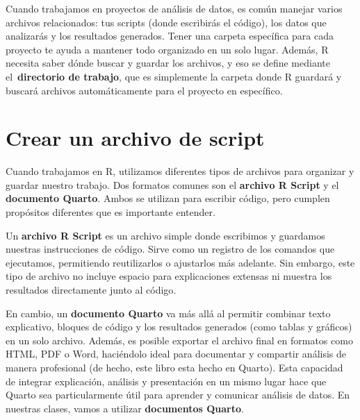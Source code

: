 \documentclass[
  letterpaper,
  DIV=11,
  numbers=noendperiod,
  twoside]{scrreprt}
\begin{document}
Cuando trabajamos en proyectos de análisis de datos, es común manejar
varios archivos relacionados: tus scripts (donde escribirás el código),
los datos que analizarás y los resultados generados. Tener una carpeta
específica para cada proyecto te ayuda a mantener todo organizado en un
solo lugar. Además, R necesita saber dónde buscar y guardar los
archivos, y eso se define mediante el~\textbf{directorio de trabajo},
que es simplemente la carpeta donde R guardará y buscará archivos
automáticamente para el proyecto en específico.

\section{Crear un archivo de script}\label{crear-un-archivo-de-script}

Cuando trabajamos en R, utilizamos diferentes tipos de archivos para
organizar y guardar nuestro trabajo. Dos formatos comunes son el
\textbf{archivo R Script} y el \textbf{documento Quarto}. Ambos se
utilizan para escribir código, pero cumplen propósitos diferentes que es
importante entender.

Un \textbf{archivo R Script} es un archivo simple donde escribimos y
guardamos nuestras instrucciones de código. Sirve como un registro de
los comandos que ejecutamos, permitiendo reutilizarlos o ajustarlos más
adelante. Sin embargo, este tipo de archivo no incluye espacio para
explicaciones extensas ni muestra los resultados directamente junto al
código.

En cambio, un \textbf{documento Quarto} va más allá al permitir combinar
texto explicativo, bloques de código y los resultados generados (como
tablas y gráficos) en un solo archivo. Además, es posible exportar el
archivo final en formatos como HTML, PDF o Word, haciéndolo ideal para
documentar y compartir análisis de manera profesional (de hecho, este
libro esta hecho en Quarto). Esta capacidad de integrar explicación,
análisis y presentación en un mismo lugar hace que Quarto sea
particularmente útil para aprender y comunicar análisis de datos. En
nuestras clases, vamos a utilizar \textbf{documentos Quarto}.
\end{document}
